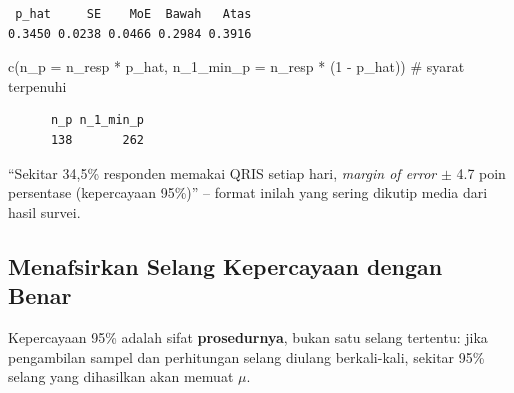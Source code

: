 \documentclass[
  indonesian,
  letterpaper,
]{book}
\newenvironment{Shaded}{\begin{snugshade}}{\end{snugshade}}
\newcommand{\AttributeTok}[1]{\textcolor[rgb]{0.40,0.45,0.13}{#1}}
\newcommand{\CommentTok}[1]{\textcolor[rgb]{0.37,0.37,0.37}{#1}}
\newcommand{\DecValTok}[1]{\textcolor[rgb]{0.68,0.00,0.00}{#1}}
\newcommand{\FunctionTok}[1]{\textcolor[rgb]{0.28,0.35,0.67}{#1}}
\newcommand{\NormalTok}[1]{\textcolor[rgb]{0.00,0.23,0.31}{#1}}
\newcommand{\SpecialCharTok}[1]{\textcolor[rgb]{0.37,0.37,0.37}{#1}}
\begin{document}
\begin{verbatim}
 p_hat     SE    MoE  Bawah   Atas 
0.3450 0.0238 0.0466 0.2984 0.3916 
\end{verbatim}

\begin{Shaded}
\begin{Highlighting}[]
\FunctionTok{c}\NormalTok{(}\AttributeTok{n\_p =}\NormalTok{ n\_resp }\SpecialCharTok{*}\NormalTok{ p\_hat, }\AttributeTok{n\_1\_min\_p =}\NormalTok{ n\_resp }\SpecialCharTok{*}\NormalTok{ (}\DecValTok{1} \SpecialCharTok{{-}}\NormalTok{ p\_hat))   }\CommentTok{\# syarat terpenuhi}
\end{Highlighting}
\end{Shaded}

\begin{verbatim}
      n_p n_1_min_p 
      138       262 
\end{verbatim}

``Sekitar 34,5\% responden memakai QRIS setiap hari, \emph{margin of
error} \(\pm\) 4.7 poin persentase (kepercayaan 95\%)'' -- format inilah
yang sering dikutip media dari hasil survei.

\subsection{Menafsirkan Selang Kepercayaan dengan
Benar}\label{menafsirkan-selang-kepercayaan-dengan-benar}

Kepercayaan 95\% adalah sifat \textbf{prosedurnya}, bukan satu selang
tertentu: jika pengambilan sampel dan perhitungan selang diulang
berkali-kali, sekitar 95\% selang yang dihasilkan akan memuat \(\mu\).
\end{document}
